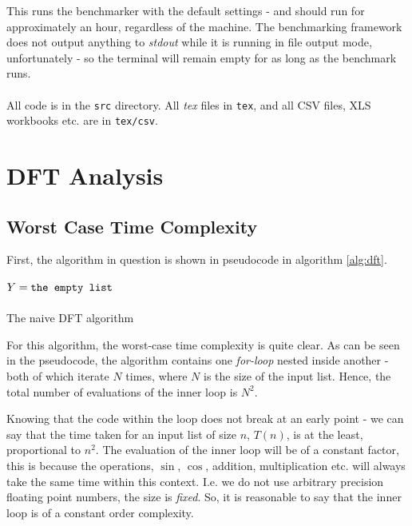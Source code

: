 \documentclass[]{article}
\begin{document}
This runs the benchmarker with the default settings - and should run for approximately an hour, regardless of the machine. The benchmarking framework does not output anything to \emph{stdout} while it is running in file output mode, unfortunately - so the terminal will remain empty for as long as the benchmark runs.
\\\\
All code is in the \texttt{src} directory. All \emph{tex} files in \texttt{tex}, and all CSV files, XLS workbooks etc. are in \texttt{tex/csv}.

\section{DFT Analysis}\label{sec:dft}
\subsection{Worst Case Time Complexity}\label{sec:dft-worst}
First, the algorithm in question is shown in pseudocode in algorithm \ref{alg:dft}.

\begin{algorithm}[h]
	$Y = \verb|the empty list|$\\
	\\
\caption{The naive DFT algorithm\label{alg:dft}}
\end{algorithm}

For this algorithm, the worst-case time complexity is quite clear. As can be seen in the pseudocode, the algorithm contains one \emph{for-loop} nested inside another - both of which iterate $N$ times, where $N$ is the size of the input list. Hence, the total number of evaluations of the inner loop is $N^2$.
	
Knowing that the code within the loop does not break at an early point - we can say that the time taken for an input list of size $n$, $T(n)$, is at the least, proportional to $n^2$. The evaluation of the inner loop will be of a constant factor, this is because the operations, $\sin$, $\cos$, addition, multiplication etc. will always take the same time within this context. I.e. we do not use arbitrary precision floating point numbers, the size is \emph{fixed}. So, it is reasonable to say that the inner loop is of a constant order complexity.
\end{document}

